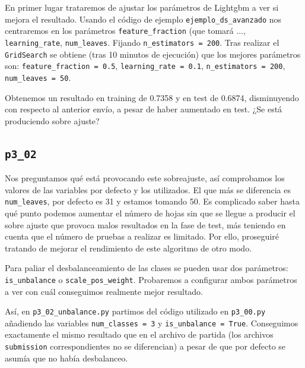 \documentclass[a4paper, 20pt]{article}
\begin{document}
En primer lugar trataremos de ajustar los parámetros de Lightgbm a ver si mejora el resultado. Usando el código de ejemplo \texttt{ejemplo\_ds\_avanzado} nos centraremos en los parámetros \texttt{feature\_fraction} (que tomará ..., \texttt{learning\_rate}, \texttt{num\_leaves}. Fijando \texttt{n\_estimators = 200}. Tras realizar el \texttt{GridSearch} se obtiene (tras 10 minutos de ejecución) que los mejores parámetros son: \texttt{feature\_fraction = 0.5}, \texttt{learning\_rate = 0.1},  \texttt{n\_estimators = 200}, \texttt{num\_leaves = 50}.

Obtenemos un resultado en training de 0.7358 y en test de 0.6874, disminuyendo con respecto al anterior envío, a pesar de haber aumentado en test. ¿Se está produciendo sobre ajuste?

\subsection{\texttt{p3\_02}}

Nos preguntamos qué está provocando este sobreajuste, así comprobamos los valores de las variables por defecto y los utilizados. El que más se diferencia es \texttt{num\_leaves}, por defecto es 31 y estamos tomando 50. Es complicado saber hasta qué punto podemos aumentar el número de hojas sin que se llegue a producir el sobre ajuste que provoca malos resultados en la fase de test, más teniendo en cuenta que el número de pruebas a realizar es limitado. Por ello, proseguiré tratando de mejorar el rendimiento de este algoritmo de otro modo.

Para paliar el desbalanceamiento de las clases se pueden usar dos parámetros: \texttt{is\_unbalance} o \texttt{scale\_pos\_weight}.
Probaremos a configurar ambos parámetros a ver con cuál conseguimos realmente mejor resultado.

Así, en \texttt{p3\_02\_unbalance.py} partimos del código utilizado en \texttt{p3\_00.py} añadiendo las variables \texttt{num\_classes = 3} y \texttt{is\_unbalance = True}. Conseguimos exactamente el mismo resultado que en el archivo de partida (los archivos \texttt{submission} correspondientes no se diferencian) a pesar de que por defecto se asumía que no había desbalanceo. 
\end{document}
